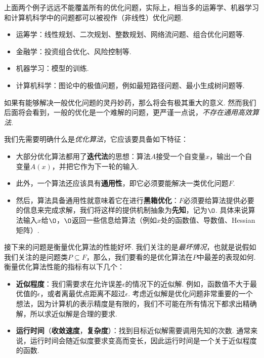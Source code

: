 上面两个例子远远不能覆盖所有的优化问题，实际上，相当多的运筹学、机器学习和计算机科学中的问题都可以被视作（非线性）优化问题. 
\begin{itemize}
    \item 运筹学：线性规划、二次规划、整数规划、网络流问题、组合优化问题等.
    \item 金融学：投资组合优化、风险控制等.
    \item 机器学习：模型的训练.
    \item 计算机科学：图论中的极值问题，例如最短路径问题、最小生成树问题等.
\end{itemize}

如果有能够解决一般优化问题的灵丹妙药，那么将会有极其重大的意义. 然而我们后面将会看到，一般的优化是一个难解的问题，更严谨一点说，\emph{不存在通用高效算法}. 

我们先需要明确什么是\emph{优化算法}，它应该要具备如下特征：
\begin{itemize}
    \item 大部分优化算法都用了\textbf{迭代法}的思想：算法$A$接受一个自变量$x$，输出一个自变量$A(x)$，并把它作为下一轮的输入.
    \item 此外，一个算法还应该具有\textbf{通用性}，即它必须要能解决一类优化问题$F$.
    \item 然后，算法具备通用性就意味着它在进行\textbf{黑箱优化}：$F$必须要给算法提供必要的信息来完成求解，我们将这样的提供机制抽象为\textbf{先知}，记为$\O$. 具体来说算法输入$x$给$\O$，$\O$返回一些信息给算法（例如$x$处的函数值、导数值、Hessian矩阵）.
\end{itemize}

接下来的问题是衡量优化算法的性能好坏. 我们关注的是\emph{最坏情况}，也就是说假如我们关注的是问题类$P\subseteq F$，那么，我们要看的是优化算法在$P$中最差的表现如何. 衡量优化算法性能的指标有以下几个：

\begin{itemize}
    \item \textbf{近似程度}：我们需要求在允许误差$\epsilon$的情况下的近似解. 例如，函数值不大于最优值的$\epsilon$，或者离最优点距离不超过$\epsilon$. 考虑近似解是优化问题非常重要的一个想法，因为计算机的表示精度是有限的，我们不可能在所有情况下都求出精确解，所以求近似解是合理的要求. 
    \item \textbf{运行时间}（\textbf{收敛速度}，\textbf{复杂度}）：找到目标近似解需要调用先知的次数. 通常来说，运行时间会随近似度要求变高而变长，因此运行时间是一个关于近似程度的函数.
\end{itemize}

